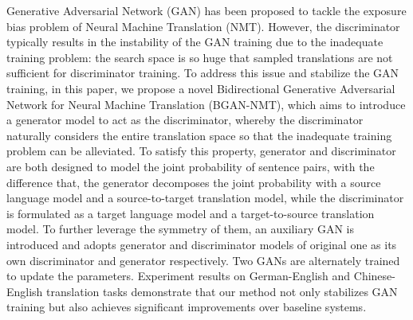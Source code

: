 Generative Adversarial Network (GAN) has been proposed to tackle the exposure bias problem of Neural Machine Translation (NMT). However, the discriminator typically results in the instability of the GAN training due to the inadequate training problem: the search space is so huge that sampled translations are not sufficient for discriminator training. To address this issue and stabilize the GAN training, in this paper, we propose a novel Bidirectional Generative Adversarial Network for Neural Machine Translation (BGAN-NMT), which aims to introduce a generator model to act as the discriminator, whereby the discriminator naturally considers the entire translation space so that the inadequate training problem can be alleviated. To satisfy this property, generator and discriminator are both designed to model the joint probability of sentence pairs, with the difference that, the generator decomposes the joint probability with a source language model and a source-to-target translation model, while the discriminator is formulated as a target language model and a target-to-source translation model. To further leverage the symmetry of them, an auxiliary GAN is introduced and adopts generator and discriminator models of original one as its own discriminator and generator respectively. Two GANs are alternately trained to update the parameters. Experiment results on German-English and Chinese-English translation tasks demonstrate that our method not only stabilizes GAN training but also achieves significant improvements over baseline systems.
